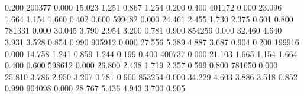 \documentclass{article}
\begin{document}
\section{}

\part{}	
	
\section{}

\section{}

0.200     200377    0.000     15.023    1.251     0.867     1.254     0.200    
0.400     401172    0.000     23.096    1.664     1.154     1.660     0.402    
0.600     599482    0.000     24.461    2.455     1.730     2.375     0.601    
0.800     781331    0.000     30.045    3.790     2.954     3.200     0.781    
0.900     854259    0.000     32.460    4.640     3.931     3.528     0.854    
0.990     905912    0.000     27.556    5.389     4.887     3.687     0.904    
0.200     199916    0.000     14.758    1.241     0.859     1.244     0.199    
0.400     400737    0.000     21.103    1.665     1.154     1.664     0.400    
0.600     598612    0.000     26.800    2.438     1.719     2.357     0.599    
0.800     781650    0.000     25.810    3.786     2.950     3.207     0.781    
0.900     853254    0.000     34.229    4.603     3.886     3.518     0.852    
0.990     904098    0.000     28.767    5.436     4.943     3.700     0.905  
\end{document}
